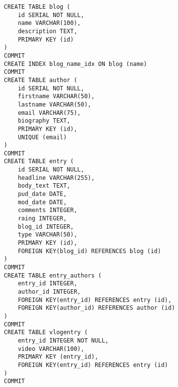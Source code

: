 \documentclass[ing,male,java,dept456]{diploma}						%
\begin{document}
\begin{lstlisting}[label=src:sqla-mappingSQL, caption=Reprezentace schéma z výpisu \ref{src:sqla-mapping} v PostgreSQL vygenerovaná rámcem SQLAlchemy, style=customsql]
CREATE TABLE blog (
	id SERIAL NOT NULL, 
	name VARCHAR(100), 
	description TEXT, 
	PRIMARY KEY (id)
)
COMMIT
CREATE INDEX blog_name_idx ON blog (name)
COMMIT
CREATE TABLE author (
	id SERIAL NOT NULL, 
	firstname VARCHAR(50), 
	lastname VARCHAR(50), 
	email VARCHAR(75), 
	biography TEXT, 
	PRIMARY KEY (id), 
	UNIQUE (email)
)
COMMIT 
CREATE TABLE entry (
	id SERIAL NOT NULL, 
	headline VARCHAR(255), 
	body_text TEXT, 
	pud_date DATE, 
	mod_date DATE, 
	comments INTEGER, 
	raing INTEGER, 
	blog_id INTEGER, 
	type VARCHAR(50), 
	PRIMARY KEY (id), 
	FOREIGN KEY(blog_id) REFERENCES blog (id)
)
COMMIT
CREATE TABLE entry_authors (
	entry_id INTEGER, 
	author_id INTEGER, 
	FOREIGN KEY(entry_id) REFERENCES entry (id), 
	FOREIGN KEY(author_id) REFERENCES author (id)
)
COMMIT
CREATE TABLE vlogentry (
	entry_id INTEGER NOT NULL, 
	video VARCHAR(100), 
	PRIMARY KEY (entry_id), 
	FOREIGN KEY(entry_id) REFERENCES entry (id)
)
COMMIT
\end{lstlisting}
\end{document}
